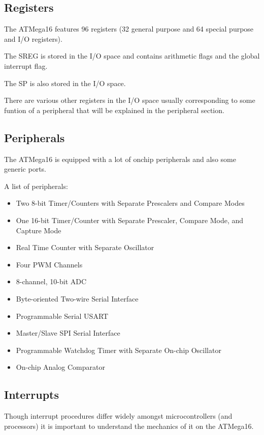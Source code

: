 \subsection{Registers}

The ATMega16 features 96 registers (32 general purpose and 64 special 
purpose and I/O registers).

The \ac{SREG} is stored in the I/O space and contains arithmetic flags
and the global interrupt flag.

The \ac{SP} is also stored in the I/O space.

There are various other registers in the I/O space usually corresponding
to some funtion of a peripheral that will be explained in the peripheral
section. \cite[p.331]{ATMegaDS}

\subsection{Peripherals}

The ATMega16 is equipped with a lot of onchip peripherals and also some
generic ports.

A list of peripherals\cite[p.1]{ATMegaDS}:
\begin{itemize}
\item{Two 8-bit Timer/Counters with Separate Prescalers and Compare Modes} 
\item{One 16-bit Timer/Counter with Separate Prescaler, Compare Mode, and Capture Mode}
\item{Real Time Counter with Separate Oscillator}
\item{Four PWM Channels}
\item{8-channel, 10-bit ADC}
\item{Byte-oriented Two-wire Serial Interface}
\item{Programmable Serial USART}
\item{Master/Slave SPI Serial Interface}
\item{Programmable Watchdog Timer with Separate On-chip Oscillator}
\item{On-chip Analog Comparator}
\end{itemize}

\subsection{Interrupts}

Though interrupt procedures differ widely amongst microcontrollers (and processors)
it is important to understand the mechanics of it on the ATMega16. 

